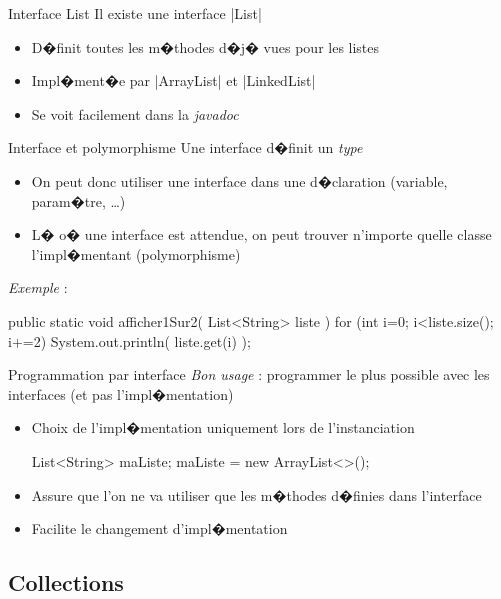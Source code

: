 \begin{frame}{Interface List}
Il existe une interface \java|List|
\begin{itemize}
\item D�finit toutes les m�thodes d�j� vues pour les listes
\item Impl�ment�e par \java|ArrayList| et \java|LinkedList|
\item Se voit facilement dans la \textit{javadoc}
\end{itemize}
\end{frame}

\begin{frame}[fragile]{Interface et polymorphisme}
Une interface d�finit un \textit{type}
\begin{itemize}
\item On peut donc utiliser une interface dans une d�claration (variable, param�tre, \dots)
\item L� o� une interface est attendue, on peut trouver n'importe quelle classe l'impl�mentant
(polymorphisme)
\end{itemize}
\emph{Exemple} : 
\begin{Java}
  public static void afficher1Sur2( List<String> liste ) {
    for (int i=0; i<liste.size(); i+=2) {
      System.out.println( liste.get(i) );
    }
  }
\end{Java}
\end{frame}

\begin{frame}[fragile]{Programmation par interface}
\emph{Bon usage} : programmer le plus possible avec les interfaces (et pas l'impl�mentation)
\begin{itemize}
  \item Choix de l'impl�mentation uniquement lors de l'instanciation
  \begin{Java}
  List<String> maListe;
  maListe = new ArrayList<>(); 
  \end{Java}
  \item Assure que l'on ne va utiliser que les m�thodes d�finies dans l'interface
  \item Facilite le changement d'impl�mentation
\end{itemize}
\end{frame}

\subsection{Collections}

